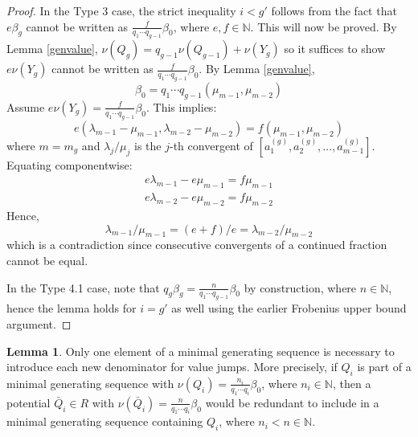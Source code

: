 \documentclass[11pt]{amsart}
\theoremstyle{definition}
\newtheorem{lem}[thm]{Lemma}
\begin{document}
{\begin{proof}
In the Type 3 case, the strict inequality $i<g'$ follows from the fact that $e\beta_g$ cannot be written as $\displaystyle \frac{f}{q_1\cdots q_{g-1}}\beta_0$, where $e,f\in\mathbb{N}$. This will now be proved. By Lemma \ref{genvalue}, $\nu(Q_g)=q_{g-1}\nu(Q_{g-1})+\nu(Y_g)$ so it suffices to show $e\nu(Y_g)$ cannot be written as $\displaystyle \frac{f}{q_1\cdots q_{g-1}}\beta_0$. By Lemma \ref{genvalue},
\begin{equation*}
\beta_0=q_1\cdots q_{g-1}(\mu_{m-1},\mu_{m-2})
\end{equation*}
Assume $\displaystyle e\nu(Y_g)=\frac{f}{q_1\cdots q_{g-1}}\beta_0$. This implies:
\begin{equation*}
e\left(\lambda_{m-1}-\mu_{m-1},\lambda_{m-2}-\mu_{m-2}\right)=f\left(\mu_{m-1},\mu_{m-2}\right)
\end{equation*}
where $m=m_g$ and $\lambda_j/\mu_j$ is the $j$-th convergent of $\left[a_1^{(g)},a_2^{(g)},\ldots,a_{m-1}^{(g)}\right]$. Equating componentwise:
\begin{equation*}
\begin{array}{l}
e\lambda_{m-1}-e\mu_{m-1}=f\mu_{m-1} \\
e\lambda_{m-2}-e\mu_{m-2}=f\mu_{m-2}
\end{array}
\end{equation*}
Hence,
\begin{equation*}
\lambda_{m-1}/\mu_{m-1}=(e+f)/e=\lambda_{m-2}/\mu_{m-2}
\end{equation*}
which is a contradiction since consecutive convergents of a continued fraction cannot be equal.

In the Type 4.1 case, note that $\displaystyle q_g \beta_g=\frac{n}{q_1\cdots q_{g-1}}\beta_0$ by construction, where $n\in\mathbb{N}$, hence the lemma holds for $i=g'$ as well using the earlier Frobenius upper bound argument.
\end{proof}

\begin{lem} \label{nonredundant}
Only one element of a minimal generating sequence is necessary to introduce each new denominator for value jumps. More precisely, if $Q_i$ is part of a minimal generating sequence with $\displaystyle \nu(Q_i)=\frac{n_i}{q_1\cdots q_i}\beta_0$, where $n_i\in\mathbb{N}$, then a potential $\bar Q_i\in R$ with $\displaystyle \nu(\bar Q_i)=\frac{n}{q_1\cdots q_i}\beta_0$ would be redundant to include in a minimal generating sequence containing $Q_i$, where $n_i<n\in\mathbb{N}$.
\end{lem}

}
\end{document}
